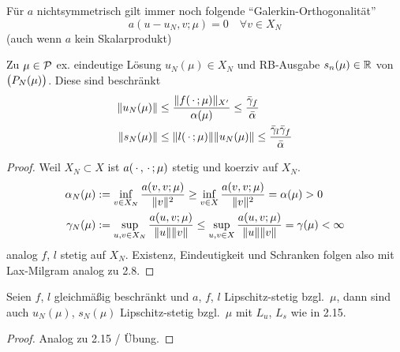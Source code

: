 \begin{bem}
	Für $a$ nichtsymmetrisch gilt immer noch folgende ``Galerkin-Orthogonalität''
	\[
		a(u-u_N,v;\mu) = 0 \quad \forall v \in X_N
	\]
	(auch wenn $a$ kein Skalarprodukt)
\end{bem}

\begin{satz}
	Zu $\mu \in \mathcal{P}$ ex. eindeutige Lösung $u_N(\mu) \in X_N$ und RB-Ausgabe $s_n(\mu) \in \mathbb{R}$ von $\big(P_N(\mu)\big)$.
	Diese sind beschränkt
	\begin{align*}
		\|u_N(\mu)\| &\leq \frac{\|f(\,\cdot\,;\mu)\|_{X'}}{\alpha(\mu)} \leq \frac{\bar\gamma_f}{\bar\alpha}\\
		\|s_N(\mu)\| &\leq \|l(\,\cdot\,;\mu)\| \|u_N(\mu)\| \leq \frac{\bar\gamma_l \bar\gamma_f}{\bar\alpha}
	\end{align*}

	\begin{proof}
		Weil $X_N \subset X$ ist $a(\,\cdot\,,\,\cdot\,;\mu)$ stetig und koerziv auf $X_N$.
		\begin{align*}
			\alpha_N(\mu) &:= \inf_{v \in X_N} \frac{a(v,v;\mu)}{\|v\|^2} \geq \inf_{v \in X} \frac{a(v,v;\mu)}{\|v\|^2} = \alpha(\mu) > 0\\
			\gamma_N(\mu) &:= \sup_{u,v \in X_N} \frac{a(u,v;\mu)}{\|u\| \|v\|} \leq \sup_{u,v \in X} \frac{a(u,v;\mu)}{\|u\| \|v\|} = \gamma(\mu) < \infty
		\end{align*}
		analog $f$, $l$ stetig auf $X_N$. Existenz, Eindeutigkeit und Schranken folgen also mit Lax-Milgram analog zu 2.8.
	\end{proof}
\end{satz}

\begin{kor}
	Seien $f$, $l$ gleichmäßig beschränkt und $a$, $f$, $l$ Lipschitz-stetig bzgl.\ $\mu$, dann sind auch $u_N(\mu)$, $s_N(\mu)$ Lipschitz-stetig bzgl.\ $\mu$ mit $L_u$, $L_s$ wie in 2.15.

	\begin{proof}
		Analog zu 2.15 / Übung.
	\end{proof}
\end{kor}

